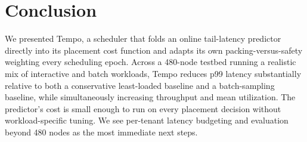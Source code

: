 \section{Conclusion}
\label{sec:conclusion}

We presented Tempo, a scheduler that folds an online tail-latency predictor
directly into its placement cost function and adapts its own
packing-versus-safety weighting every scheduling epoch. Across a 480-node
testbed running a realistic mix of interactive and batch workloads, Tempo
reduces p99 latency substantially relative to both a conservative
least-loaded baseline and a batch-sampling baseline, while simultaneously
increasing throughput and mean utilization. The predictor's cost is small
enough to run on every placement decision without workload-specific
tuning. We see per-tenant latency budgeting and evaluation beyond 480
nodes as the most immediate next steps.



